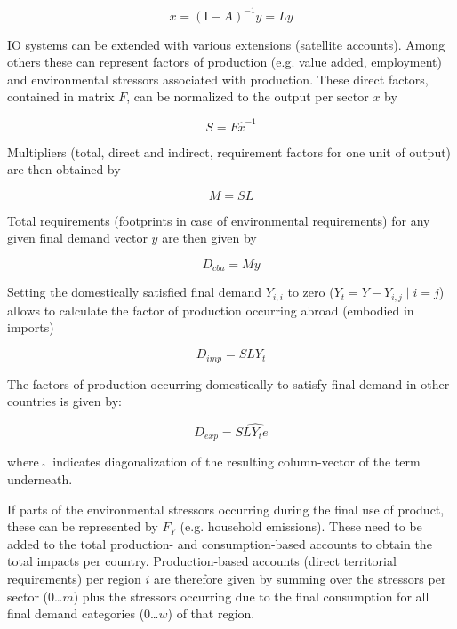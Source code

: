 \documentclass{jors}
\begin{document}
{\begin{equation}
    x = (\mathrm{I}- A)^{-1}y = Ly
\end{equation}


IO systems can be extended with various extensions (satellite accounts).
Among others these can represent factors of production (e.g. value added, employment)
and environmental stressors associated with production.
These direct factors, contained in matrix $F$, can be normalized to the output per sector $x$ by

\begin{equation}
    S = F\hat{x}^{-1}
\end{equation}

Multipliers (total, direct and indirect, requirement factors for one unit of output) are then obtained by

\begin{equation}
    M = SL
\end{equation}



Total requirements (footprints in case of environmental requirements) for any
given final demand vector $y$ are then given by 

\begin{equation}
    D_{cba} = My
\end{equation}

Setting the domestically satisfied final demand $Y_{i,i}$ to zero ($Y_{t} = Y -
Y_{i,j}\; |\; i = j$) allows to calculate the factor of production occurring
abroad (embodied in imports)

\begin{equation}
    D_{imp} = SLY_{t}
\end{equation}

The factors of production occurring domestically to satisfy final demand in
other countries is given by: 

\begin{equation}
    D_{exp} = S\widehat{LY_{t}e}
\end{equation}

where $\ \widehat{ }\ $ indicates diagonalization of the resulting column-vector of the term underneath.

If parts of the environmental stressors occurring during the final use of product,
these can be represented by $F_Y$ (e.g. household emissions). 
These need to be added to the total production- and consumption-based accounts to obtain the total impacts per country. 
Production-based accounts (direct territorial requirements) per region $i$ are therefore given by summing over the stressors per sector (0\ldots$m$) 
plus the stressors occurring due to the final consumption for all final demand categories (0\ldots$w$) of that region.

}
\end{document}
